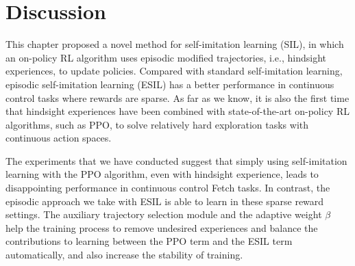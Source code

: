 \begin{table}[h]
  \centering
   \caption{Average success rate $\pm$ standard error in the last 10 epochs over five random seeds in all~environments {(\textbf{bold} indicates the best result among all methods).}}
  \label{tb:ch3_last}
\end{table}

\section{Discussion}
\label{sec:conclusion}
This chapter proposed a novel method for self-imitation learning (SIL), in which an on-policy RL algorithm uses episodic modified trajectories, i.e., hindsight experiences, to update policies. Compared with standard self-imitation learning, episodic self-imitation learning (ESIL) has a better performance in continuous control tasks where rewards are sparse. As far as we know, it is also the first time that hindsight experiences have been combined with state-of-the-art on-policy RL algorithms, such as PPO, to solve relatively hard exploration tasks with continuous action spaces.

The experiments that we have conducted suggest that simply using self-imitation learning with the PPO algorithm, even with hindsight experience, leads to disappointing performance in continuous control Fetch tasks. In contrast, the episodic approach we take with ESIL is able to learn in these sparse reward settings. The auxiliary trajectory selection module and the adaptive weight $\beta$ help the training process to remove undesired experiences and balance the contributions to learning between the PPO term and the ESIL term automatically, and also increase the stability of training.

